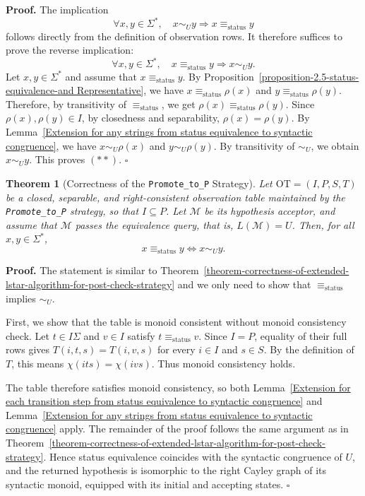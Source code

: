 \documentclass{ieice-tecrep}
\newtheorem{theorem}{Theorem}
\begin{document}
\noindent\textbf{Proof.}
The implication
\[
   \forall x,y\in\Sigma^*,\quad
   x\sim_U y
   \Longrightarrow
   x\equiv_{\mathrm{status}}y
\]
follows directly from the definition of observation rows. It therefore
suffices to prove the reverse implication:
\[
\forall x,y\in\Sigma^*,\quad
x\equiv_{\mathrm{status}}y
\Longrightarrow
x\sim_U y. \tag{**}
\]
Let \(x,y\in\Sigma^*\) and assume that \(x\equiv_{\mathrm{status}}y\).
By Proposition~\ref{proposition-2.5-status-equivalence-and Representative},
we have \(x\equiv_{\mathrm{status}}\rho(x)\) and \(y\equiv_{\mathrm{status}}\rho(y)\).
Therefore, by transitivity of \(\equiv_{\mathrm{status}}\), we get \(\rho(x)\equiv_{\mathrm{status}}\rho(y)\).
Since \(\rho(x),\rho(y)\in I\), by closedness and separability, \(\rho(x) = \rho(y)\).
By Lemma~\ref{Extension for any strings from status equivalence to syntactic congruence},
we have \(x\sim_U\rho(x)\) and \(y\sim_U\rho(y)\).
By transitivity of \(\sim_U\), we obtain \(x\sim_U y\). This proves \((**)\).  \hfill $\square$

\begin{theorem}[Correctness of the \texttt{Promote\_to\_P} Strategy]
\label{theorem-correctness-of-the-promote_to_p-strategy}
Let \(\mathrm{OT}=(I,P,S,T)\) be a closed, separable, and right-consistent
observation table maintained by the \texttt{Promote\_to\_P} strategy,
so that \(I\subseteq P\).
Let \(\mathcal M\) be its hypothesis acceptor, and assume that
\(\mathcal M\) passes the equivalence query, that is,
\(L(\mathcal M)=U\).
Then, for all \(x,y\in\Sigma^*\),
\[
x\equiv_{\mathrm{status}}y
\Longleftrightarrow x\sim_U y.
\]
\end{theorem}
\noindent\textbf{Proof.}
The statement is similar to Theorem~\ref{theorem-correctness-of-extended-lstar-algorithm-for-post-check-strategy} and we
only need to show that \(\equiv_{\mathrm{status}}\) implies \(\sim_U\).

First, we show that the table is monoid consistent without monoid consistency check.
Let \(t\in I\Sigma\) and \(v\in I\) satisfy
\(t\equiv_{\mathrm{status}}v\).
Since \(I = P\), equality of their full rows gives
\(T(i,t,s)=T(i,v,s)\) for every \(i\in I\) and \(s\in S\).
By the definition of \(T\), this means
\(\chi(its)=\chi(ivs)\).
Thus monoid consistency holds.

The table therefore satisfies monoid consistency, so both
Lemma~\ref{Extension for each transition step from status equivalence to syntactic congruence}
and
Lemma~\ref{Extension for any strings from status equivalence to syntactic congruence}
apply. The remainder of the proof follows the same argument as in
Theorem~\ref{theorem-correctness-of-extended-lstar-algorithm-for-post-check-strategy}.
Hence status equivalence coincides with the syntactic congruence
of \(U\), and the returned hypothesis is isomorphic to the right
Cayley graph of its syntactic monoid, equipped with its initial
and accepting states.
\hfill $\square$
\end{document}
